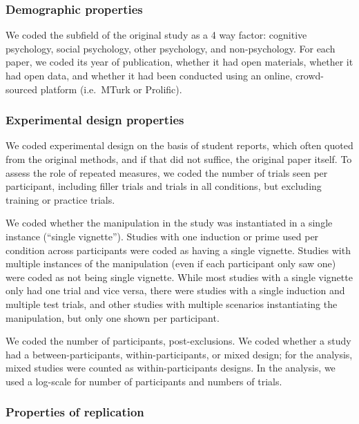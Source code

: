 \documentclass[
  english,
  a4paper,
]{article}
\begin{document}
\subsubsection{Demographic properties}\label{demographic-properties}

We coded the subfield of the original study as a 4 way factor: cognitive psychology, social psychology, other psychology, and non-psychology. For each paper, we coded its year of publication, whether it had open materials, whether it had open data, and whether it had been conducted using an online, crowd-sourced platform (i.e.~MTurk or Prolific).

\subsubsection{Experimental design properties}\label{experimental-design-properties}

We coded experimental design on the basis of student reports, which often quoted from the original methods, and if that did not suffice, the original paper itself. To assess the role of repeated measures, we coded the number of trials seen per participant, including filler trials and trials in all conditions, but excluding training or practice trials.

We coded whether the manipulation in the study was instantiated in a single instance (``single vignette''). Studies with one induction or prime used per condition across participants were coded as having a single vignette. Studies with multiple instances of the manipulation (even if each participant only saw one) were coded as not being single vignette. While most studies with a single vignette only had one trial and vice versa, there were studies with a single induction and multiple test trials, and other studies with multiple scenarios instantiating the manipulation, but only one shown per participant.

We coded the number of participants, post-exclusions. We coded whether a study had a between-participants, within-participants, or mixed design; for the analysis, mixed studies were counted as within-participants designs. In the analysis, we used a log-scale for number of participants and numbers of trials.

\subsubsection{Properties of replication}\label{properties-of-replication}
\end{document}
